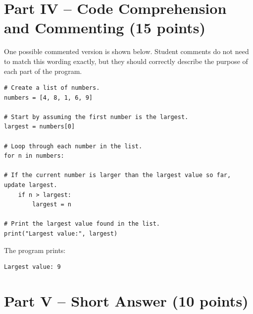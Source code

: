 \documentclass[12pt]{article}
\begin{document}
\section*{Part IV -- Code Comprehension and Commenting (15 points)}

One possible commented version is shown below. Student comments do not need to match this wording exactly, but they should correctly describe the purpose of each part of the program.

\begin{lstlisting}
# Create a list of numbers.
numbers = [4, 8, 1, 6, 9]

# Start by assuming the first number is the largest.
largest = numbers[0]

# Loop through each number in the list.
for n in numbers:

# If the current number is larger than the largest value so far, update largest.
    if n > largest:
        largest = n

# Print the largest value found in the list.
print("Largest value:", largest)
\end{lstlisting}

The program prints:

\begin{lstlisting}
Largest value: 9
\end{lstlisting}

\section*{Part V -- Short Answer (10 points)}
\end{document}
